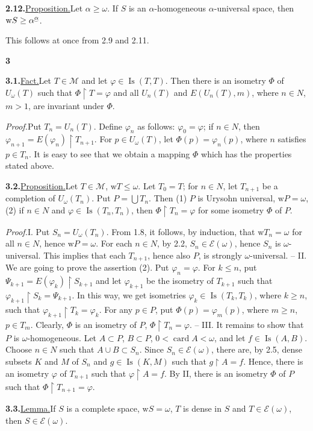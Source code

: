 \documentclass[12pt,a4paper]{article}
\newcommand{\M}{\mathcal{M}}
\newcommand{\E}{\mathcal{E}}
\newcommand{\card}{\operatorname{card}}
\newcommand{\Is}{\operatorname{Is}}
\newcommand{\wt}{\mathrm{w}}
\newcommand{\suprexp}[1]{\underaccent{\smile}{#1}}
\newcommand{\res}{\mathbin{\upharpoonright}}
\newcommand{\itemhead}[2]{\par\noindent\textbf{#1.}\enspace\underline{#2.}\enspace}
\newcommand{\prooftext}{\par\textit{Proof.}\enspace}
\newcommand{\sectionnumber}[1]{\par\medskip\begin{center}\textbf{#1}\end{center}}
\begin{document}
\itemhead{2.12}{Proposition}Let $\alpha\geq\omega$. If $S$ is an $\alpha$-homogeneous $\alpha$-universal space, then $\wt S\geq\alpha^{\suprexp{\alpha}}$.

This follows at once from 2.9 and 2.11.

\sectionnumber{3}
\itemhead{3.1}{Fact}Let $T\in\M$ and let $\varphi\in\Is(T,T)$. Then there is an isometry $\Phi$ of $U_\omega(T)$ such that $\Phi\res T=\varphi$ and all $U_n(T)$ and $E(U_n(T),m)$, where $n\in N$, $m>1$, are invariant under $\Phi$.

\prooftext Put $T_n=U_n(T)$. Define $\varphi_n$ as follows: $\varphi_0=\varphi$; if $n\in N$, then $\varphi_{n+1}=E(\varphi_n)\res T_{n+1}$. For $p\in U_\omega(T)$, let $\Phi(p)=\varphi_n(p)$, where $n$ satisfies $p\in T_n$. It is easy to see that we obtain a mapping $\Phi$ which has the properties stated above.

\itemhead{3.2}{Proposition}Let $T\in\M$, $\wt T\leq\omega$. Let $T_0=T$; for $n\in N$, let $T_{n+1}$ be a completion of $U_\omega(T_n)$. Put $P=\bigcup T_n$. Then (1) $P$ is Urysohn universal, $\wt P=\omega$, (2) if $n\in N$ and $\varphi\in\Is(T_n,T_n)$, then $\Phi\res T_n=\varphi$ for some isometry $\Phi$ of $P$.

\prooftext I. Put $S_n=U_\omega(T_n)$. From 1.8, it follows, by induction, that $\wt T_n=\omega$ for all $n\in N$, hence $\wt P=\omega$. For each $n\in N$, by 2.2, $S_n\in\E(\omega)$, hence $S_n$ is $\omega$-universal. This implies that each $T_{n+1}$, hence also $P$, is strongly $\omega$-universal. -- II. We are going to prove the assertion (2). Put $\varphi_n=\varphi$. For $k\leq n$, put $\Psi_{k+1}=E(\varphi_k)\res S_{k+1}$ and let $\varphi_{k+1}$ be the isometry of $T_{k+1}$ such that $\varphi_{k+1}\res S_k=\Psi_{k+1}$. In this way, we get isometries $\varphi_k\in\Is(T_k,T_k)$, where $k\geq n$, such that $\varphi_{k+1}\res T_k=\varphi_k$. For any $p\in P$, put $\Phi(p)=\varphi_m(p)$, where $m\geq n$, $p\in T_m$. Clearly, $\Phi$ is an isometry of $P$, $\Phi\res T_n=\varphi$. -- III. It remains to show that $P$ is $\omega$-homogeneous. Let $A\subset P$, $B\subset P$, $0<\card A<\omega$, and let $f\in\Is(A,B)$. Choose $n\in N$ such that $A\cup B\subset S_n$. Since $S_n\in\E(\omega)$, there are, by 2.5, dense subsets $K$ and $M$ of $S_n$ and $g\in\Is(K,M)$ such that $g\res A=f$. Hence, there is an isometry $\varphi$ of $T_{n+1}$ such that $\varphi\res A=f$. By II, there is an isometry $\Phi$ of $P$ such that $\Phi\res T_{n+1}=\varphi$.

\itemhead{3.3}{Lemma}If $S$ is a complete space, $\wt S=\omega$, $T$ is dense in $S$ and $T\in\E(\omega)$, then $S\in\E(\omega)$.
\end{document}
